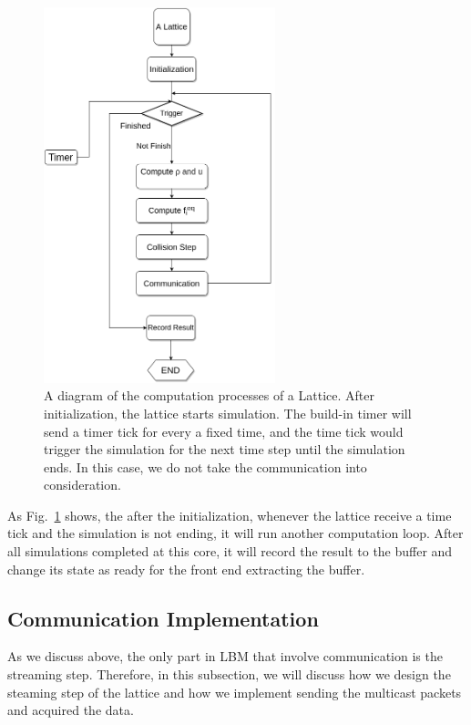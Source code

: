 \begin{figure}[tb]
   \centering
       \includegraphics[width=0.6\textwidth]{figures/computation.png}
       \caption{A diagram of the computation processes of a Lattice. After initialization, the lattice starts simulation. The build-in timer will send a timer tick for every a fixed time, and the time tick would trigger the simulation for the next time step until the simulation ends. In this case, we do not take the communication into consideration.}
       \label{fig:computation}
\end{figure}

As Fig.~\ref{fig:computation} shows, the after the initialization, whenever the lattice receive a time tick and the simulation is not ending, it will run another computation loop. After all simulations completed at this core, it will record the result to the buffer and change its state as ready for the front end extracting the buffer.\\

\subsection{Communication Implementation} \label{sec:ssc}
As we discuss above, the only part in LBM that involve communication is the streaming step. Therefore, in this subsection, we will discuss how we design the steaming step of the lattice and how we implement sending the multicast packets and acquired the data.\\
